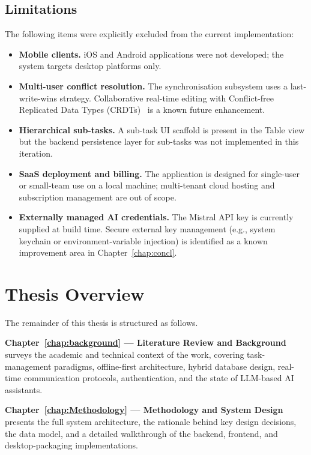 \subsection*{Limitations}

The following items were explicitly excluded from the current implementation:

\begin{itemize}
    \item \textbf{Mobile clients.}
          iOS and Android applications were not developed; the system targets desktop
          platforms only.
    \item \textbf{Multi-user conflict resolution.}
          The synchronisation subsystem uses a last-write-wins strategy.
          Collaborative real-time editing with Conflict-free Replicated Data Types
          (CRDTs)~\cite{shapiro2011crdt} is a known future enhancement.
    \item \textbf{Hierarchical sub-tasks.}
          A sub-task UI scaffold is present in the Table view but the backend persistence
          layer for sub-tasks was not implemented in this iteration.
    \item \textbf{SaaS deployment and billing.}
          The application is designed for single-user or small-team use on a local machine;
          multi-tenant cloud hosting and subscription management are out of scope.
    \item \textbf{Externally managed AI credentials.}
          The Mistral API key is currently supplied at build time.
          Secure external key management (e.g., system keychain or environment-variable
          injection) is identified as a known improvement area in
          Chapter~\ref{chap:concl}.
\end{itemize}

\section{Thesis Overview}\label{sec:intro_overview}

The remainder of this thesis is structured as follows.

\textbf{Chapter~\ref{chap:background} --- Literature Review and Background} surveys
the academic and technical context of the work, covering task-management paradigms,
offline-first architecture, hybrid database design, real-time communication protocols,
authentication, and the state of LLM-based AI assistants.

\textbf{Chapter~\ref{chap:Methodology} --- Methodology and System Design} presents the
full system architecture, the rationale behind key design decisions, the data model, and
a detailed walkthrough of the backend, frontend, and desktop-packaging implementations.

